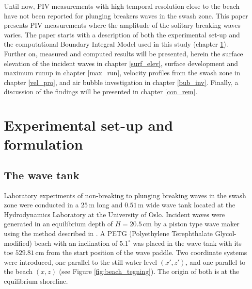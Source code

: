 \documentclass[review, authoryear]{elsarticle}
\newcommand{\cm}{\,\mbox{cm}}
\newcommand{\m}{\,\mbox{m}}
\begin{document}

Until now, PIV measurements with high temporal resolution close to the beach have not been reported for plunging breakers waves in the swash zone. This paper presents PIV measurements where the amplitude of the solitary breaking waves varies. The paper starts with a description of both the experimental set-up and the computational Boundary Integral Model used in this study (chapter \ref{experimnetal-set-up}). Further on,  measured and computed results will be presented, herein the surface elevation of the incident waves in chapter \ref{surf_elev}, surface development and maximum runup in chapter \ref{max_run}, velocity profiles from the swash zone in chapter \ref{vel_pro}, and air bubble investigation in chapter \ref{bub_inv}. Finally, a discussion of the findings will be presented in chapter \ref{con_rem}.

\section{Experimental set-up and formulation}
\label{experimnetal-set-up}

\subsection{The wave tank}
\label{wavetank}

Laboratory experiments of non-breaking to plunging breaking waves in the swash zone were conducted in  a $25\m$ long and $0.51\m$ wide wave tank 
located at the Hydrodynamics Laboratory at the University of Oslo.
Incident waves were generated in an equilibrium depth of $H=20.5\cm$ by
a piston type wave maker using the method described in 
\cite{jensen2003experimental}. 
A PETG (Polyethylene Terephthalate Glycol-modified) beach with an inclination of $5.1^{\circ}$ was placed in the wave tank with its toe $529.81\cm$ from the start position of the wave paddle. Two coordinate systems were introduced, one parallel to the still water level $(x',z')$, and one parallel to the beach $(x,z)$ (see Figure \ref{fig:beach_tegning}).  The origin of both is at the equilibrium shoreline.
\end{document}

